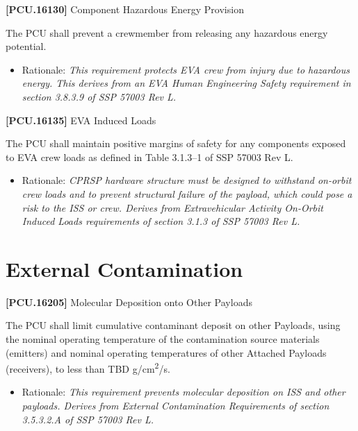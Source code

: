 \documentclass[12pt,oneside,oldfontcommands]{memoir}
\begin{document}
\textbf{[PCU.16130]} Component Hazardous Energy Provision

The \gls{PCU} shall prevent a crewmember from releasing any hazardous energy potential.

\begin{itemize}
\item{} Rationale: \emph{This requirement protects EVA crew from injury due to hazardous energy. This derives from an EVA Human Engineering Safety requirement in section 3.8.3.9 of SSP 57003 Rev L.}

\end{itemize}

\textbf{[PCU.16135]} EVA Induced Loads

The \gls{PCU} shall maintain positive margins of safety for any components exposed to EVA crew loads as defined in Table 3.1.3--1 of SSP 57003 Rev L.

\begin{itemize}
\item{} Rationale: \emph{CPRSP hardware structure must be designed to withstand on-orbit crew loads and to prevent structural failure of the payload, which could pose a risk to the ISS or crew. Derives from Extravehicular Activity On-Orbit Induced Loads requirements of section 3.1.3 of SSP 57003 Rev L.}

\end{itemize}

\section{External Contamination}
\label{externalcontamination}

\textbf{[PCU.16205]} Molecular Deposition onto Other Payloads

The \gls{PCU} shall limit cumulative contaminant deposit on other Payloads, using the nominal operating temperature of the contamination source materials (emitters) and nominal operating temperatures of other Attached Payloads (receivers), to less than TBD\label{tbx_9} g\slash cm\textsuperscript{2}\slash s.

\begin{itemize}
\item{} Rationale: \emph{This requirement prevents molecular deposition on ISS and other payloads. Derives from External Contamination Requirements of section 3.5.3.2.A of SSP 57003 Rev L.}

\end{itemize}
\end{document}
